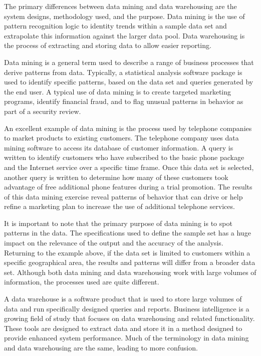 The primary differences between data mining and data warehousing are the system designs, methodology used, and the purpose. Data mining is the use of pattern recognition logic to identity trends within a sample data set and extrapolate this information against the larger data pool. Data warehousing is the process of extracting and storing data to allow easier reporting.

Data mining is a general term used to describe a range of business processes that derive patterns from data. Typically, a statistical analysis software package is used to identify specific patterns, based on the data set and queries generated by the end user. A typical use of data mining is to create targeted marketing programs, identify financial fraud, and to flag unusual patterns in behavior as part of a security review.

An excellent example of data mining is the process used by telephone companies to market products to existing customers. The telephone company uses data mining software to access its database of customer information. A query is written to identify customers who have subscribed to the basic phone package and the Internet service over a specific time frame. Once this data set is selected, another query is written to determine how many of these customers took advantage of free additional phone features during a trial promotion. The results of this data mining exercise reveal patterns of behavior that can drive or help refine a marketing plan to increase the use of additional telephone services.

It is important to note that the primary purpose of data mining is to spot patterns in the data. The specifications used to define the sample set has a huge impact on the relevance of the output and the accuracy of the analysis. Returning to the example above, if the data set is limited to customers within a specific geographical area, the results and patterns will differ from a broader data set. Although both data mining and data warehousing work with large volumes of information, the processes used are quite different.

A data warehouse is a software product that is used to store large volumes of data and run specifically designed queries and reports. Business intelligence is a growing field of study that focuses on data warehousing and related functionality. These tools are designed to extract data and store it in a method designed to provide enhanced system performance. Much of the terminology in data mining and data warehousing are the same, leading to more confusion.

